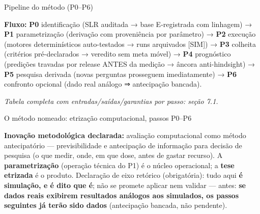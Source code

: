 \documentclass[12pt,a4paper,oneside]{report}
\begin{document}
Pipeline do método (P0--P6)

\textbf{Fluxo:} \textbf{P0} identificação (SLR auditada → base
E-registrada com linhagem) → \textbf{P1} parametrização (derivação com
proveniência por parâmetro) → \textbf{P2} execução (motores
determinísticos auto-testados → runs arquivados {[}SIM{]}) → \textbf{P3}
colheita (critérios pré-declarados → veredito sem meta móvel) →
\textbf{P4} prognóstico (predições travadas por release ANTES da medição
→ âncora anti-hindsight) → \textbf{P5} pesquisa derivada (novas
perguntas prosseguem imediatamente) → \textbf{P6} confronto opcional
(dado real análogo ⇒ antecipação bancada).

\emph{Tabela completa com entradas/saídas/garantias por passo: seção
7.1.}

O método nomeado: etrização computacional, passos P0--P6

\textbf{Inovação metodológica declarada:} avaliação computacional como
método antecipatório --- previsibilidade e antecipação de informação
para decisão de pesquisa (o que medir, onde, em que dose, antes de
gastar recurso). A \textbf{parametrização} (operação técnica do P1) é o
núcleo operacional; a \textbf{tese etrizada} é o produto. Declaração de
eixo retórico (obrigatória): tudo aqui \textbf{é simulação, e é dito que
é}; não se promete aplicar nem validar --- antes: \textbf{se dados reais
exibirem resultados análogos aos simulados, os passos seguintes já terão
sido dados} (antecipação bancada, não pendente).
\end{document}
